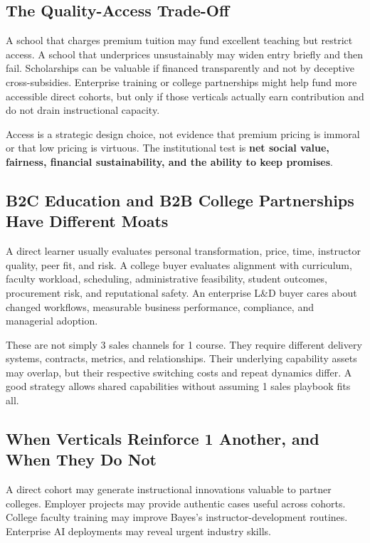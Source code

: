 \subsection{The Quality-Access Trade-Off}
\label{sec:quality_access_tradeoff}

A school that charges premium tuition may fund excellent teaching but restrict access. A school that underprices unsustainably may widen entry briefly and then fail. Scholarships can be valuable if financed transparently and not by deceptive cross-subsidies. Enterprise training or college partnerships might help fund more accessible direct cohorts, but only if those verticals actually earn contribution and do not drain instructional capacity.

Access is a strategic design choice, not evidence that premium pricing is immoral or that low pricing is virtuous. The institutional test is \textbf{net social value, fairness, financial sustainability, and the ability to keep promises}.

\subsection{B2C Education and B2B College Partnerships Have Different Moats}
\label{sec:b2c_and_b2b_different_moats}

A direct learner usually evaluates personal transformation, price, time, instructor quality, peer fit, and risk. A college buyer evaluates alignment with curriculum, faculty workload, scheduling, administrative feasibility, student outcomes, procurement risk, and reputational safety. An enterprise L\&D buyer cares about changed workflows, measurable business performance, compliance, and managerial adoption.

These are not simply 3 sales channels for 1 course. They require different delivery systems, contracts, metrics, and relationships. Their underlying capability assets may overlap, but their respective switching costs and repeat dynamics differ. A good strategy allows shared capabilities without assuming 1 sales playbook fits all.

\subsection{When Verticals Reinforce 1 Another, and When They Do Not}
\label{sec:when_verticals_reinforce_one_another}

A direct cohort may generate instructional innovations valuable to partner colleges. Employer projects may provide authentic cases useful across cohorts. College faculty training may improve Bayes's instructor-development routines. Enterprise AI deployments may reveal urgent industry skills.

